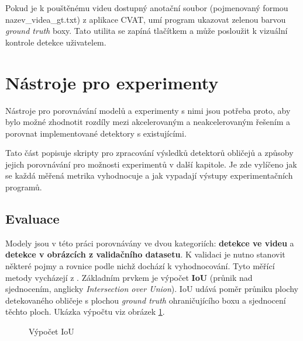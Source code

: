 Pokud je k pouštěnému videu dostupný anotační soubor (pojmenovaný formou nazev\_videa\_gt.txt) z aplikace CVAT, umí program ukazovat zelenou barvou \emph{ground truth} boxy. Tato utilita se zapíná tlačítkem  a může posloužit k vizuální kontrole detekce uživatelem.

\section{Nástroje pro experimenty}
\label{sekce:nastroje_pro_experimenty}
Nástroje pro porovnávání modelů a experimenty s nimi jsou potřeba proto, aby bylo možné zhodnotit rozdíly mezi akcelerovaným a neakcelerovaným řešením a porovnat implementované detektory s existujícími.

Tato část popisuje skripty pro zpracování výsledků detektorů obličejů a způsoby jejich porovnávání pro možnosti experimentů v další kapitole. Je zde vylíčeno jak se každá měřená metrika vyhodnocuje a jak vypadají výstupy experimentačních programů.

\subsection*{Evaluace}
Modely jsou v této práci porovnávány ve dvou kategoriích: \textbf{detekce ve videu} a \textbf{detekce v obrázcích z validačního datasetu}. K validaci je nutno stanovit některé pojmy a rovnice podle nichž dochází k vyhodnocování. Tyto měřící metody vycházejí z \cite{detekceMetriky}. Základním prvkem je výpočet \textbf{IoU} (průnik nad sjednocením, anglicky \emph{Intersection over Union}). IoU udává poměr průniku plochy detekovaného obličeje s plochou \emph{ground truth} ohraničujícího boxu a sjednocení těchto ploch. Ukázka výpočtu viz obrázek \ref{obrazek:iou}.

\begin{figure}[H] %
  \begin{center}
  \label{obrazek:iou}
  \caption{Výpočet IoU}
  \end{center}
\end{figure}

